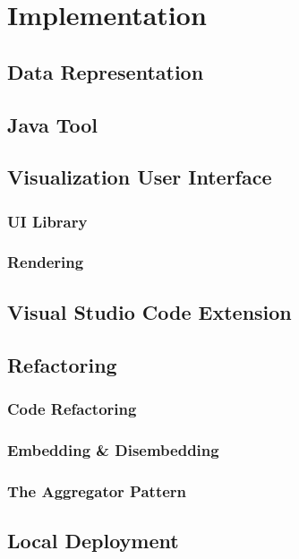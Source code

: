 \chapter{Implementation}

\section{Data Representation}
\section{Java Tool}

\section{Visualization User Interface}
\subsection{UI Library}
\subsection{Rendering}


\section{Visual Studio Code Extension}

\section{Refactoring}
\subsection{Code Refactoring}
\subsection{Embedding \& Disembedding}
\subsection{The Aggregator Pattern}

\section{Local Deployment}
